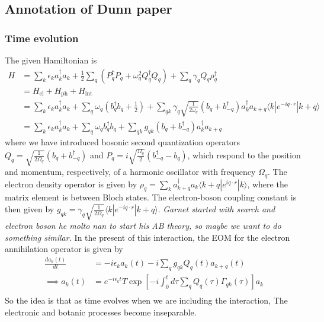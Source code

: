 \subsection{Annotation of Dunn paper}
\subsubsection{Time evolution}
The given Hamiltonian is 
\begin{align}
    H &= \sum_k \epsilon_k a_k^\dagger a_k + \frac{1}{2} \sum_q (P_q^\dagger P_q + \omega_q^2 Q_q^\dagger Q_q) + \sum_{q} \gamma_q Q_q \rho_q^\dagger \\
&= H_{\mathrm{el}} + H_{\mathrm{ph}} + H_{\mathrm{int}} \\
&= \sum_k \epsilon_k a_k^\dagger a_k + \sum_q \omega_q \left(b_q^\dagger b_q + \frac{1}{2}\right) + \sum_{qk} \gamma_q \sqrt{\frac{1}{2\omega_q}} (b_q + b_{-q}^\dagger) a_k^\dagger a_{k+q} \langle k | e^{-i q \cdot r} | k+q \rangle \\
&= \sum_k \epsilon_k a_k^\dagger a_k + \sum_q \omega_q b_q^\dagger b_q + \sum_{qk} g_{qk} (b_q + b_{-q}^\dagger) a_k^\dagger a_{k+q}
\end{align}
where we have introduced bosonic second quantization operators $Q_q= \sqrt{\frac{1}{2 \Omega_q}}\left(b_q+b_{-q}^{\dagger}\right)$ and $P_q=i \sqrt{\frac{\Omega_q}{2}}\left(b_{-q}^{\dagger}-b_q\right)$, which respond to the position and momentum, respectively, of a harmonic oscillator with frequency $\Omega_q$. The electron density operator is given by $\rho_q=\sum_k a_{k+q}^{\dagger} a_k \langle k+q| e^{i q \cdot r}|k\rangle$, where the matrix element is between Bloch states. The electron-boson coupling constant is then given by $g_{q k}=\gamma_q \sqrt{\frac{1}{2 \Omega_q}}\langle k| e^{-i q \cdot r}|k+q\rangle$. \emph{Garnet started with search and electron boson he molto nan to start his AB theory, so maybe we want to do something similar.} In the present of this interaction, the EOM for the electron annihilation operator is given by
\begin{align}
    \frac{d a_k(t)}{d t} &= -i \epsilon_k a_k(t) - i \sum_q g_{q k} Q_q(t) a_{k+q}(t) \\
\implies a_k(t) &= e^{-i \epsilon_k t} T \exp \left[-i \int_0^t d \tau \sum_q Q_q(\tau) \Gamma_{q k}(\tau)\right] a_k \\
\end{align} 
So the idea is that as time evolves when we are including the interaction, The electronic and botanic processes become inseparable.
